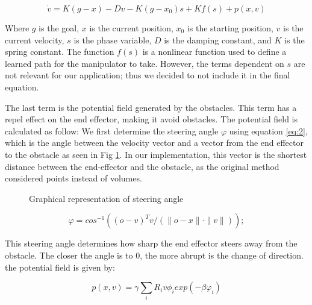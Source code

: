 \documentclass[a4paper, 10pt, conference]{ieeeconf}      %
\begin{document}
\begin{equation} \label{eq:1}
	\dot{v} = K ( g - x ) - D v - K (g - x_0) s + K f(s) + p(x, v)
\end{equation}

Where $g$ is the goal, $x$ is the current position, $x_0$ is the starting position, $v$ is the current velocity, $s$ is the phase variable, $D$ is the damping constant, and $K$ is the spring constant. The function $f(s)$ is a nonlinear function used to define a learned path for the manipulator to take. However, the terms dependent on $s$ are not relevant for our application; thus we decided to not include it in the final equation.  

The last term is the potential field generated by the obstacles. This term has a repel effect on the end effector, making it avoid obstacles. The potential field is calculated as follow: We first determine the steering angle $\varphi$ using equation \ref{eq:2}, which is the angle between the velocity vector and a vector from the end effector to the obstacle as seen in Fig \ref{steering_image}. In our implementation, this vector is the shortest distance between the end-effector and the obstacle, as the original method considered points instead of volumes.


\begin{figure}
	\centering
	\caption{Graphical representation of steering angle \cite{1}}
	\label{steering_image}
\end{figure}

\begin{equation} \label{eq:2}
	\varphi = cos^{-1} ((o-v)^T v / (\|o-x\| \cdot \|v\|));
\end{equation}

This steering angle determines how sharp the end effector steers away from the obstacle. The closer the angle is to 0, the more abrupt is the change of direction. the potential field is given by:

\begin{equation}
	p(x, v) = \gamma \sum_i R_i v \phi_i exp(-\beta \varphi_i) 
\end{equation}
\end{document}
